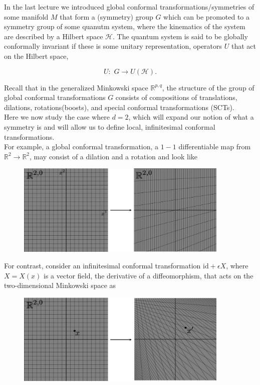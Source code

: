 
\noindent In the last lecture we introduced global conformal transformations/symmetries of some manifold $M$ that form a (symmetry) group $G$ which can be promoted to a symmetry group of some quanutm system, where the kinematics of the system are described by a Hilbert space $\mathcal{H}$. The quantum system is said to be globally conformally invariant if these is some unitary representation, operators $U$ that act on the Hilbert space,

\begin{equation}
U: \,\, G \rightarrow U(\mathcal{H}).
\end{equation}

\noindent Recall that in the generalized Minkowski space $\mathbb{R}^{p,q}$, the structure of the group of global conformal transformations $G$ consists of compositions of translations, dilations, rotations(boosts), and special conformal transformations (SCTs). \\

\noindent Here we now study the case where $d=2$, which will expand our notion of what a symmetry is and will allow us to define local, infinitesimal conformal transformations. \\

\noindent For example, a global conformal transformation, a $1-1$ differentiable map from $\mathbb{R}^2 \rightarrow \mathbb{R}^2$, may consist of a dilation and a rotation and look like

\begin{figure}[H]
	\centering
	\includegraphics[width=4in]{images/global_conf_trans.png} 
\end{figure} 

\noindent For contrast, consider an infinitesimal conformal transformation $\text{id} + \epsilon X$, where $X=X(x)$ is a vector field, the derivative of a diffeomorphism, that acts on the two-dimensional Minkowski space as

\begin{figure}[H]
	\centering
	\includegraphics[width=4in]{images/inf_conf_trans.png} 
\end{figure} 

